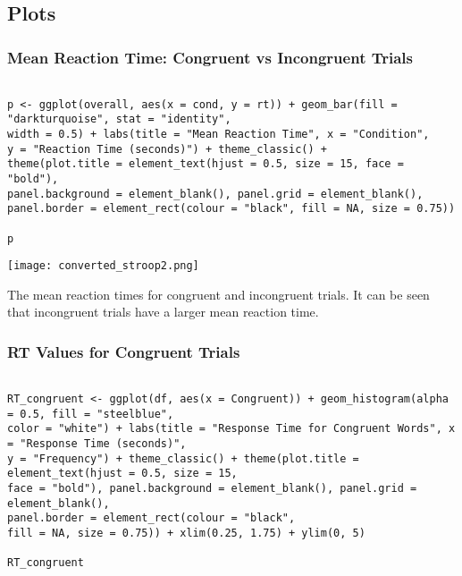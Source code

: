 \documentclass{article}
\begin{document}
\subsection{Plots}
\label{sec:org614ca52}
\subsubsection{Mean Reaction Time: Congruent vs Incongruent Trials}
\label{sec:orgb865d41}
\begin{verbatim}

p <- ggplot(overall, aes(x = cond, y = rt)) + geom_bar(fill = "darkturquoise", stat = "identity", 
width = 0.5) + labs(title = "Mean Reaction Time", x = "Condition", 
y = "Reaction Time (seconds)") + theme_classic() + 
theme(plot.title = element_text(hjust = 0.5, size = 15, face = "bold"), 
panel.background = element_blank(), panel.grid = element_blank(), 
panel.border = element_rect(colour = "black", fill = NA, size = 0.75))

p
\end{verbatim}

\begin{center}
\texttt{[image: converted\_stroop2.png]}
\end{center}

\begin{center}
The mean reaction times for congruent and incongruent trials. It can be seen \\ that incongruent trials have a larger mean reaction time.
\end{center}

\subsubsection{RT Values for Congruent Trials}
\label{sec:orge59fd64}
\begin{verbatim}

RT_congruent <- ggplot(df, aes(x = Congruent)) + geom_histogram(alpha = 0.5, fill = "steelblue", 
color = "white") + labs(title = "Response Time for Congruent Words", x = "Response Time (seconds)", 
y = "Frequency") + theme_classic() + theme(plot.title = element_text(hjust = 0.5, size = 15, 
face = "bold"), panel.background = element_blank(), panel.grid = element_blank(), 
panel.border = element_rect(colour = "black", 
fill = NA, size = 0.75)) + xlim(0.25, 1.75) + ylim(0, 5)

RT_congruent

\end{verbatim}
\end{document}
